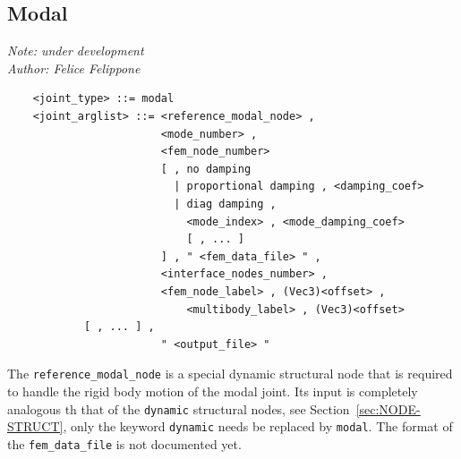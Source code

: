\documentclass[10pt,dvips]{report}
\begin{document}
\subsection{Modal}\label{ELEMS-JOINT-MODAL}
{\em 
    Note: under development \\
    Author: Felice Felippone
}
\begin{verbatim}
    <joint_type> ::= modal
    <joint_arglist> ::= <reference_modal_node> ,
                        <mode_number> ,
                        <fem_node_number> 
                        [ , no damping 
                          | proportional damping , <damping_coef>
                          | diag damping , 
                            <mode_index> , <mode_damping_coef> 
                            [ , ... ] 
                        ] , " <fem_data_file> " ,
                        <interface_nodes_number> ,
                        <fem_node_label> , (Vec3)<offset> ,
                            <multibody_label> , (Vec3)<offset>
			[ , ... ] ,
                        " <output_file> "
\end{verbatim}
The {\tt reference\_modal\_node} is a special dynamic structural node that
is required to handle the rigid body motion of the modal joint.
Its input is completely analogous th that of the {\tt dynamic} structural
nodes, see Section~\ref{sec:NODE-STRUCT}, only the keyword {\tt dynamic} 
needs be replaced by {\tt modal}.
The format of the {\tt fem\_data\_file} is not documented yet.
\end{document}
